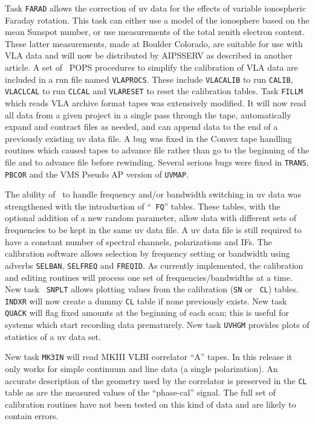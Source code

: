    Task {\tt FARAD} allows the correction of uv data for the effects of
variable ionospheric Faraday rotation.  This task can either use a
model of the ionosphere based on the mean Sunspot number, or use
measurements of the total zenith electron content.  These latter
measurements, made at Boulder Colorado, are suitable for use with
VLA data and will now be distributed by AIPSSERV as described in
another article.
A set of \AIPS\  POPS procedures to simplify the calibration of VLA
data are included in a run file named {\tt VLAPROCS}.  These include
{\tt VLACALIB} to run {\tt CALIB}, {\tt VLACLCAL} to run {\tt CLCAL}
and {\tt VLARESET} to reset the calibration tables.
Task {\tt FILLM} which reads VLA archive format tapes was extensively
modified.  It will now read all data from a given project in a single
pass through the tape, automatically expand and contract files as
needed, and can append data to the end of a previously existing uv data
file.  A bug was fixed in the Convex tape handling routines which
caused tapes to advance file rather than go to the beginning of the
file and to advance file before rewinding.
Several serious bugs were fixed in {\tt TRANS}, {\tt PBCOR} and the
VMS Pseudo AP version of {\tt UVMAP}.

   The ability of \AIPS\ to handle frequency and/or bandwidth
switching in uv data was strengthened with the introduction of ``{\tt
FQ}'' tables.  These tables, with the optional addition of a new
random parameter, allow data with different sets of frequencies to be
kept in the same uv data file.  A uv data file is still required to
have a constant number of spectral channels, polarizations and IFs.
The calibration software allows selection by frequency setting or
bandwidth using adverbs {\tt SELBAN}, {\tt SELFREQ} and {\tt FREQID}.
As currently implemented, the calibration and editing routines will
process one set of frequencies/bandwidths at a time.  New task {\tt
SNPLT} allows plotting values from the calibration ({\tt SN} or {\tt
CL}) tables.  {\tt INDXR} will now create a dummy {\tt CL} table if
none previously exists.  New task {\tt QUACK} will flag fixed amounts
at the beginning of each scan; this is useful for systems which start
recording data prematurely.  New task {\tt UVHGM} provides plots of
statistics of a uv data set.

   New task {\tt MK3IN} will read MKIII VLBI correlator ``A'' tapes.  In this
release it only works for simple continuum and line data (a single
polarization).  An accurate description of the geometry used by the
correlator is preserved in the {\tt CL} table as are the measured values of
the ``phase-cal'' signal.  The full set of calibration routines have not
been tested on this kind of data and are likely to contain errors.


